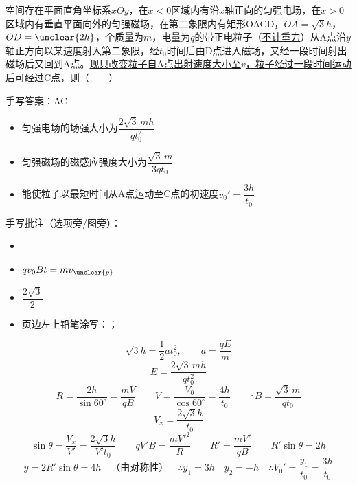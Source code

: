 \begin{problem}[13（贴纸印刷题）]
空间存在平面直角坐标系$xOy$，在$x<0$区域内有沿$x$轴正向的匀强电场，在$x>0$区域内有垂直平面向外的匀强磁场，在第二象限内有矩形OACD，$OA=\sqrt3h$，$OD=\unclear{2h}$，个质量为$m$，电量为$q$的带正电粒子（\underline{不计重力}）从A点沿$y$轴正方向以某速度射入第二象限，经$t_0$时间后由D点进入磁场，又经一段时间射出磁场后又回到A点。\underline{现只改变粒子自A点出射速度大小至$v$，}\underline{粒子经过一段时间运动后可经过C点，}则（　　）

手写答案：AC

\begin{itemize}
\item[A.] 匀强电场的场强大小为$\dfrac{2\sqrt3\,mh}{qt_0^2}$ %
\item[B.] 匀强磁场的磁感应强度大小为$\dfrac{\sqrt3\,m}{3qt_0}$ %
\item[C.] 能使粒子以最短时间从A点运动至C点的初速度$v_0'=\dfrac{3h}{t_0}$ %
\end{itemize}

手写批注（选项旁/图旁）：
\begin{itemize}
\item {} %
\item $qv_0Bt=mv_{\unclear{p}}$ %
\item $\dfrac{2\sqrt3}{2}$ %
\item 页边左上铅笔涂写：；
\end{itemize}


\begin{solution}
\[
\sqrt3h=\frac12at_0^2,\qquad a=\frac{qE}{m}
\]
\[
E=\frac{2\sqrt3\,mh}{qt_0^2}
\]
\[
R=\frac{2h}{\sin60^\circ}=\frac{mV}{qB}\qquad V=\frac{V_0}{\cos60^\circ}=\frac{4h}{t_0}\qquad\therefore B=\frac{\sqrt3\,m}{qt_0}
\]
\[
V_x=\frac{2\sqrt3h}{t_0}
\]
\[
\sin\theta=\frac{V_x}{V'}=\frac{2\sqrt3h}{V't_0}\qquad qV'B=\frac{mV'^2}{R}\qquad R'=\frac{mV'}{qB}\qquad R'\sin\theta=2h
\] %
\[
y=2R'\sin\theta=4h\quad\text{（由对称性）}\quad\therefore y_1=3h\quad y_2=-h\quad\therefore V_0'=\frac{y_1}{t_0}=\frac{3h}{t_0}
\]
\end{solution}
\end{problem}
